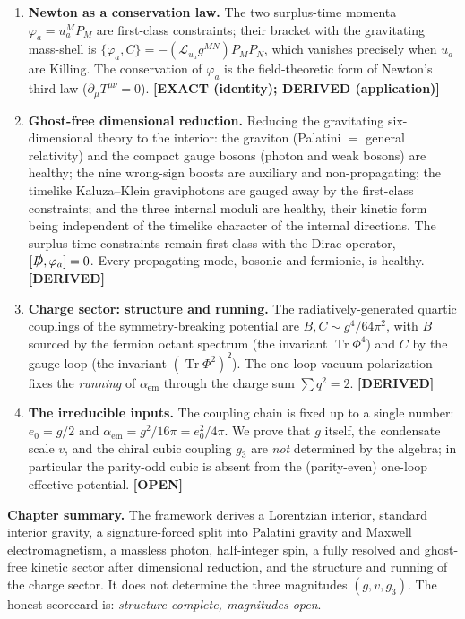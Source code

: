 \documentclass[11pt,oneside]{book}
\newcommand{\Tr}{\operatorname{Tr}}
\newcommand{\Lie}{\mathcal{L}}
\newcommand{\Dirac}{\slashed{D}}
\newcommand{\status}[1]{{\sffamily\bfseries\color{statuscol}[#1]}}
\theoremstyle{plain}
\theoremstyle{definition}
\theoremstyle{remark}
\begin{document}
\begin{enumerate}[leftmargin=1.4em,itemsep=3pt]
\item \textbf{Newton as a conservation law.} The two surplus-time momenta
$\varphi_a=u_a^M P_M$ are first-class constraints; their bracket with the
gravitating mass-shell is $\{\varphi_a,C\}=-(\Lie_{u_a}g^{MN})P_MP_N$, which
vanishes precisely when $u_a$ are Killing. The conservation of $\varphi_a$ is the
field-theoretic form of Newton's third law ($\partial_\mu T^{\mu\nu}=0$).
\status{EXACT (identity); DERIVED (application)}

\item \textbf{Ghost-free dimensional reduction.} Reducing the gravitating
six-dimensional theory to the interior: the graviton (Palatini $=$ general
relativity) and the compact gauge bosons (photon and weak bosons) are healthy; the
nine wrong-sign boosts are auxiliary and non-propagating; the timelike
Kaluza--Klein graviphotons are gauged away by the first-class constraints; and the
three internal moduli are healthy, their kinetic form being independent of the
timelike character of the internal directions. The surplus-time constraints remain
first-class with the Dirac operator, $[\Dirac,\varphi_a]=0$. Every propagating
mode, bosonic and fermionic, is healthy. \status{DERIVED}

\item \textbf{Charge sector: structure and running.} The radiatively-generated
quartic couplings of the symmetry-breaking potential are $B,C\sim g^4/64\pi^2$,
with $B$ sourced by the fermion octant spectrum (the invariant $\Tr\Phi^4$) and
$C$ by the gauge loop (the invariant $(\Tr\Phi^2)^2$). The one-loop vacuum
polarization fixes the \emph{running} of $\alpha_{\mathrm{em}}$ through the charge
sum $\sum q^2=2$. \status{DERIVED}

\item \textbf{The irreducible inputs.} The coupling chain is fixed up to a single
number: $e_0=g/2$ and $\alpha_{\mathrm{em}}=g^2/16\pi=e_0^2/4\pi$. We prove that
$g$ itself, the condensate scale $v$, and the chiral cubic coupling $g_3$ are
\emph{not} determined by the algebra; in particular the parity-odd cubic is absent
from the (parity-even) one-loop effective potential. \status{OPEN}
\end{enumerate}

\begin{leavesbox}
\textbf{Chapter summary.} The framework derives a Lorentzian interior, standard
interior gravity, a signature-forced split into Palatini gravity and Maxwell
electromagnetism, a massless photon, half-integer spin, a fully resolved and
ghost-free kinetic sector after dimensional reduction, and the structure and
running of the charge sector. It does not determine the three magnitudes
$(g,v,g_3)$. The honest scorecard is: \emph{structure complete, magnitudes open}.
\end{leavesbox}
\end{document}
